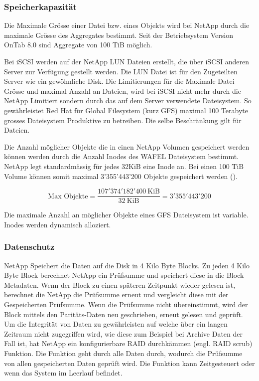 \subsubsection{Speicherkapazität}
Die Maximale Grösse einer Datei bzw. eines Objekts wird bei NetApp durch die maximale Grösse des Aggregates bestimmt. Seit der Betriebsystem Version OnTab 8.0 sind Aggregate von 100 TiB möglich.

Bei iSCSI werden auf der NetApp LUN Dateien erstellt, die über iSCSI anderen Server zur Verfügung gestellt werden. Die LUN Datei ist für den Zugeteilten Server wie ein gewöhnliche Disk. Die Limitierungen für die Maximale Datei Grösse und maximal Anzahl an Dateien, wird bei iSCSI nicht mehr durch die NetApp Limitiert sondern durch das auf dem Server verwendete Dateisystem. So gewährleistet Red Hat für Global Filesystem (kurz GFS) maximal 100 Terabyte grosses Dateisystem Produktive zu betreiben. Die selbe Beschränkung gilt für Dateien. 

Die Anzahl möglicher Objekte die in einen NetApp Volumen gespeichert werden können werden durch die Anzahl Inodes des WAFEL Dateisystem bestimmt. NetApp legt standardmässig für jedes 32KiB eine Inode an. Bei einen 100 TiB Volume können somit maximal 3'355'443'200 Objekte gespeichert werden ().

\begin{equation}
\mbox{Max Objekte} = \frac{107'374'182'400 \mathrm{\ KiB}}{32 \mathrm{\ KiB}}= 3'355'443'200 
\label{eqn:MaxObjekteNetApp}
\end{equation}

Die maximale Anzahl an möglicher Objekte eines GFS Dateisystem ist variable. Inodes werden dynamisch alloziert.

\subsubsection*{Datenschutz}
NetApp Speichert die Daten auf die Disk in 4 Kilo Byte Blocks. Zu jeden 4 Kilo Byte Block berechnet NetApp ein Prüfsumme und speichert diese in die Block Metadaten. Wenn der Block zu einen späteren Zeitpunkt wieder gelesen ist, berechnet die NetApp die Prüfsumme erneut und vergleicht diese mit der Gespeicherten Prüfsumme. Wenn die Prüfsumme nicht übereinstimmt, wird der Block mittels den Paritäts-Daten neu geschrieben, erneut gelesen und geprüft. Um die Integrität von Daten zu gewährleisten auf welche über ein langen Zeitraum nicht zugegriffen wird, wie diese zum Beispiel bei Archive Daten der Fall ist, hat NetApp ein konfigurierbare RAID durchkämmen (engl. RAID scrub) Funktion. Die Funktion geht durch alle Daten durch, wodurch die Prüfsumme von allen gespeicherten Daten geprüft wird. Die Funktion kann Zeitgesteuert oder wenn das System im Leerlauf befindet. \cite{Sundaram2006}

